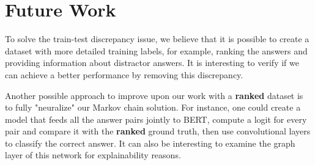 \documentclass{article}
\begin{document}
\section{Future Work}
To solve the train-test discrepancy issue, we believe that it is possible to create a dataset with more detailed training labels, for example, ranking the answers and providing information about distractor answers. It is interesting to verify if we can achieve a better performance by removing this discrepancy.

Another possible approach to improve upon our work with a \textbf{ranked} dataset is to fully "neuralize" our Markov chain solution. For instance, one could create a model that feeds all the answer pairs jointly to  BERT, compute a logit for every pair and compare it with the \textbf{ranked} ground truth, then use convolutional layers to classify the correct answer. It can also be interesting to examine the graph layer of this network for explainability reasons.  

\nocite{langley00}






\end{document}
